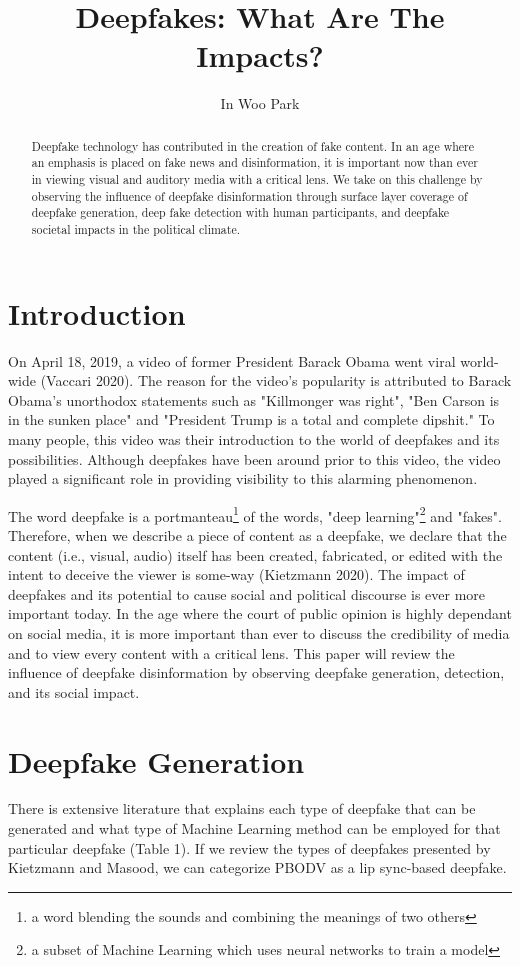 \documentclass[
  journal=small,
  manuscript=article-type,  %
  year=2020,
  volume=37,
]{cup-journal}
\title{Deepfakes: What Are The Impacts?}
\author{In Woo Park}
\affiliation{ICS 691D, UH MANOA, Honolulu, HI}
\begin{document}
\begin{abstract}
Deepfake technology has contributed in the creation of fake content. In an age where an emphasis is placed on fake news and disinformation, it is important now than ever in viewing visual and auditory media with a critical lens. We take on this challenge by observing the influence of deepfake disinformation through surface layer coverage of deepfake generation, deep fake detection with human participants, and deepfake societal impacts in the political climate. 
\end{abstract}

\section{Introduction}
On April 18, 2019, a video of former President Barack Obama went viral world-wide (Vaccari 2020). The reason for the video's popularity is attributed to Barack Obama's unorthodox statements such as "Killmonger was right", "Ben Carson is in the sunken place" and "President Trump is a total and complete dipshit." To many people, this video was their introduction to the world of deepfakes and its possibilities. Although deepfakes have been around prior to this video, the video played a significant role in providing visibility to this alarming phenomenon. 

The word deepfake is a portmanteau\footnote{a word blending the sounds and combining the meanings of two others} of the words, "deep learning"\footnote{a subset of Machine Learning which uses neural networks to train a model} and "fakes". Therefore, when we describe a piece of content as a deepfake, we declare that the content (i.e., visual, audio) itself has been created, fabricated, or edited with the intent to deceive the viewer is some-way (Kietzmann 2020). The impact of deepfakes and its potential to cause social and political discourse is ever more important today. In the age where the court of public opinion is highly dependant on social media, it is more important than ever to discuss the credibility of media and to view every content with a critical lens. This paper will review the influence of deepfake disinformation by observing deepfake generation, detection, and its social impact. 

\section{Deepfake Generation}
There is extensive literature that explains each type of deepfake that can be generated and what type of Machine Learning method can be employed for that particular deepfake (Table 1). If we review the types of deepfakes presented by Kietzmann and Masood, we can categorize PBODV as a lip sync-based deepfake. 
\end{document}
